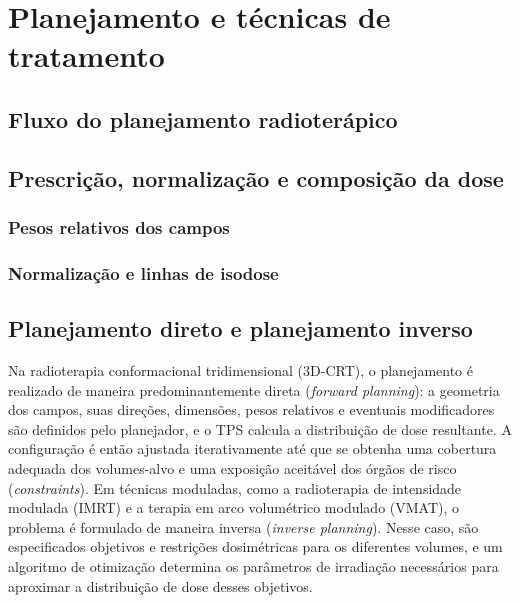 \chapter{Planejamento e técnicas de tratamento}
\label{chap:planejamento}

\section{Fluxo do planejamento radioterápico}
\label{sec:fluxo_planejamento}

\section{Prescrição, normalização e composição da dose}
\label{sec:prescricao_normalizacao}

\subsection{Pesos relativos dos campos}
\label{ssec:pesos_campos}

\subsection{Normalização e linhas de isodose}
\label{ssec:normalizacao}

\section{Planejamento direto e planejamento inverso}
\label{sec:planejamento_direto_inverso}

Na radioterapia conformacional tridimensional (3D-CRT), o planejamento é realizado de maneira predominantemente direta (\emph{forward planning}): a geometria dos campos, suas direções, dimensões, pesos relativos e eventuais modificadores são definidos pelo planejador, e o TPS calcula a distribuição de dose resultante. A configuração é então ajustada iterativamente até que se obtenha uma cobertura adequada dos volumes-alvo e uma exposição aceitável dos órgãos de risco (\emph{constraints}). Em técnicas moduladas, como a radioterapia de intensidade modulada (IMRT) e a terapia em arco volumétrico modulado (VMAT), o problema é formulado de maneira inversa (\emph{inverse planning}). Nesse caso, são especificados objetivos e restrições dosimétricas para os diferentes volumes, e um algoritmo de otimização determina os parâmetros de irradiação necessários para aproximar a distribuição de dose desses objetivos.

